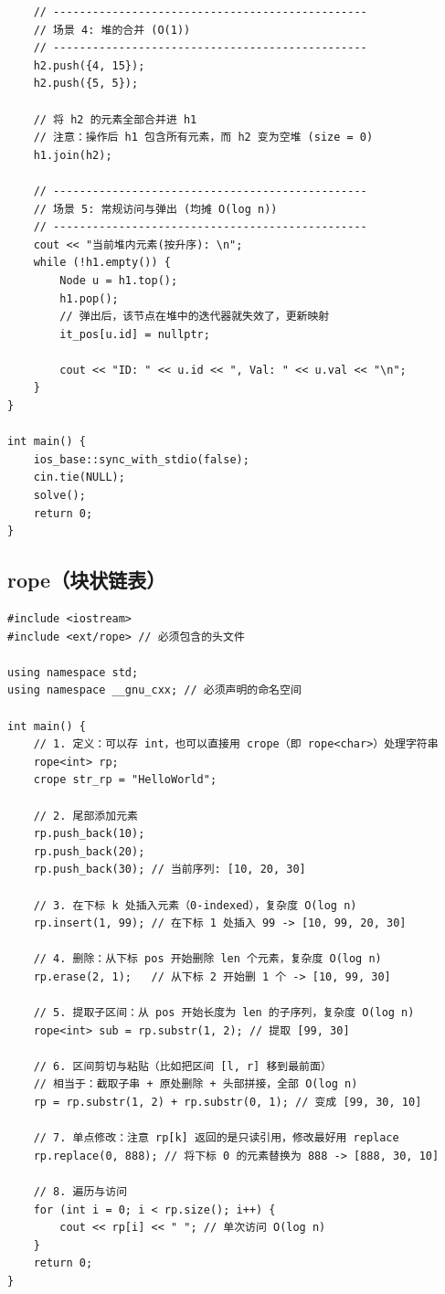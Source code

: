 \begin{lstlisting}
    // ------------------------------------------------
    // 场景 4: 堆的合并 (O(1))
    // ------------------------------------------------
    h2.push({4, 15});
    h2.push({5, 5});

    // 将 h2 的元素全部合并进 h1
    // 注意：操作后 h1 包含所有元素，而 h2 变为空堆 (size = 0)
    h1.join(h2);

    // ------------------------------------------------
    // 场景 5: 常规访问与弹出 (均摊 O(log n))
    // ------------------------------------------------
    cout << "当前堆内元素(按升序): \n";
    while (!h1.empty()) {
        Node u = h1.top();
        h1.pop();
        // 弹出后，该节点在堆中的迭代器就失效了，更新映射
        it_pos[u.id] = nullptr; 
        
        cout << "ID: " << u.id << ", Val: " << u.val << "\n";
    }
}

int main() {
    ios_base::sync_with_stdio(false);
    cin.tie(NULL);
    solve();
    return 0;
}
\end{lstlisting}

\subsection{rope（块状链表）}

\begin{lstlisting}
#include <iostream>
#include <ext/rope> // 必须包含的头文件

using namespace std;
using namespace __gnu_cxx; // 必须声明的命名空间

int main() {
    // 1. 定义：可以存 int，也可以直接用 crope（即 rope<char>）处理字符串
    rope<int> rp; 
    crope str_rp = "HelloWorld";

    // 2. 尾部添加元素
    rp.push_back(10);
    rp.push_back(20);
    rp.push_back(30); // 当前序列: [10, 20, 30]

    // 3. 在下标 k 处插入元素（0-indexed），复杂度 O(log n)
    rp.insert(1, 99); // 在下标 1 处插入 99 -> [10, 99, 20, 30]

    // 4. 删除：从下标 pos 开始删除 len 个元素，复杂度 O(log n)
    rp.erase(2, 1);   // 从下标 2 开始删 1 个 -> [10, 99, 30]

    // 5. 提取子区间：从 pos 开始长度为 len 的子序列，复杂度 O(log n)
    rope<int> sub = rp.substr(1, 2); // 提取 [99, 30]

    // 6. 区间剪切与粘贴（比如把区间 [l, r] 移到最前面）
    // 相当于：截取子串 + 原处删除 + 头部拼接，全部 O(log n)
    rp = rp.substr(1, 2) + rp.substr(0, 1); // 变成 [99, 30, 10]

    // 7. 单点修改：注意 rp[k] 返回的是只读引用，修改最好用 replace
    rp.replace(0, 888); // 将下标 0 的元素替换为 888 -> [888, 30, 10]

    // 8. 遍历与访问
    for (int i = 0; i < rp.size(); i++) {
        cout << rp[i] << " "; // 单次访问 O(log n)
    }
    return 0;
}
\end{lstlisting}

